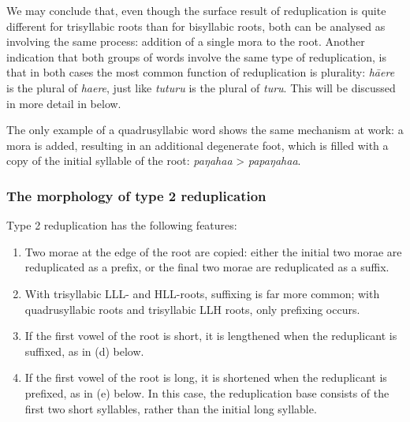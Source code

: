 We may conclude that, even though the surface result of reduplication is quite different for trisyllabic roots than for bisyllabic roots, both can be analysed as involving the same process: addition of a single mora to the root. Another indication that both groups of words involve the same type of reduplication, is that in both cases the most common function of reduplication is plurality: \textit{hā{\ꞌ}ere} is the plural of \textit{ha{\ꞌ}ere}, just like \textit{tuturu} is the plural of \textit{turu}. This will be discussed in more detail in  below.

The only example of a quadrusyllabic word shows the same mechanism at work: a mora is added, resulting in an additional degenerate foot, which is filled with a copy of the initial syllable of the root: \textit{paŋaha{\ꞌ}a} > \textit{papaŋaha{\ꞌ}a}.

\subsubsection[The morphology of type 2 reduplication]{The morphology of type 2 reduplication}\label{sec:2.6.1.2}
Type 2 reduplication has the following features:

\begin{enumerate}
\item 
Two morae at the edge of the root are copied: either the initial two morae are reduplicated as a prefix, or the final two morae are reduplicated as a suffix. 

\item 
With trisyllabic LLL- and HLL-roots, suffixing is far more common; with quadrusyllabic roots and trisyllabic LLH roots, only prefixing occurs.

\item 
If the first vowel of the root is short, it is lengthened when the reduplicant is suffixed, as in (d) below.

\item 
If the first vowel of the root is long, it is shortened when the reduplicant is prefixed, as in (e) below. In this case, the reduplication base consists of the first two short syllables, rather than the initial long syllable.

\end{enumerate}

